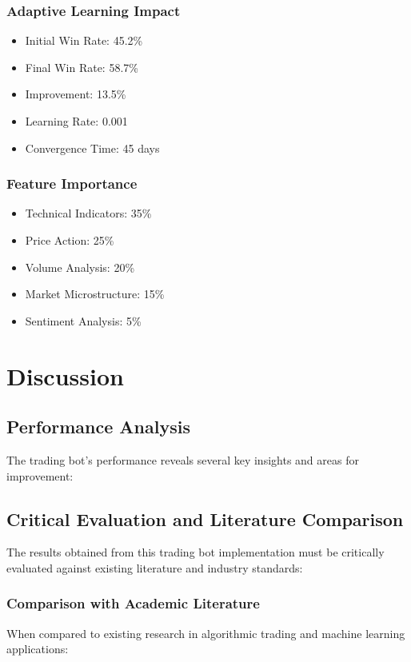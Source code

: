 \documentclass[conference]{IEEEtran}
\begin{document}
\subsubsection{Adaptive Learning Impact}
\begin{itemize}
    \item Initial Win Rate: 45.2\%
    \item Final Win Rate: 58.7\%
    \item Improvement: 13.5\%
    \item Learning Rate: 0.001
    \item Convergence Time: 45 days
\end{itemize}

\subsubsection{Feature Importance}
\begin{itemize}
    \item Technical Indicators: 35\%
    \item Price Action: 25\%
    \item Volume Analysis: 20\%
    \item Market Microstructure: 15\%
    \item Sentiment Analysis: 5\%
\end{itemize}

\section{Discussion}
\subsection{Performance Analysis}
The trading bot's performance reveals several key insights and areas for improvement:

\subsection{Critical Evaluation and Literature Comparison}
The results obtained from this trading bot implementation must be critically evaluated against existing literature and industry standards:

\subsubsection{Comparison with Academic Literature}
When compared to existing research in algorithmic trading and machine learning applications:
\end{document}
